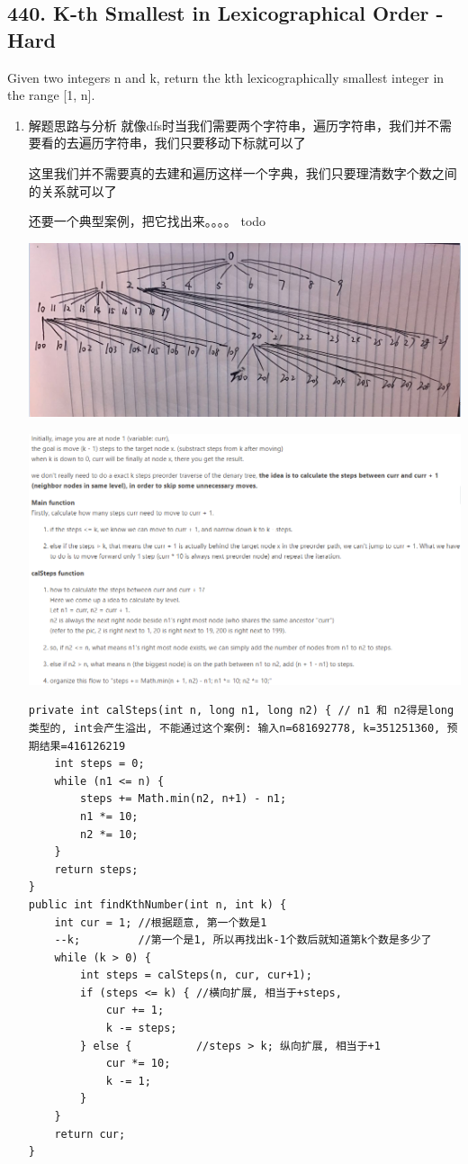 \documentclass[9pt, b5paaper]{book}
\begin{document}
\subsection{440. K-th Smallest in Lexicographical Order -  Hard}
\label{sec-2-1-4}
Given two integers n and k, return the kth lexicographically smallest integer in the range [1, n].
\begin{enumerate}
\item 解题思路与分析
\label{sec-2-1-4-1}
就像dfs时当我们需要两个字符串，遍历字符串，我们并不需要看的去遍历字符串，我们只要移动下标就可以了

这里我们并不需要真的去建和遍历这样一个字典，我们只要理清数字个数之间的关系就可以了

还要一个典型案例，把它找出来。。。。 todo

\includegraphics[width=.9\linewidth]{./pic/trie.png}

\includegraphics[width=.9\linewidth]{./pic/trie2.png}

\begin{verbatim}
private int calSteps(int n, long n1, long n2) { // n1 和 n2得是long类型的, int会产生溢出, 不能通过这个案例: 输入n=681692778, k=351251360, 预期结果=416126219
    int steps = 0;
    while (n1 <= n) {
        steps += Math.min(n2, n+1) - n1;
        n1 *= 10;
        n2 *= 10;
    }
    return steps;
}
public int findKthNumber(int n, int k) {
    int cur = 1; //根据题意, 第一个数是1
    --k;         //第一个是1, 所以再找出k-1个数后就知道第k个数是多少了
    while (k > 0) {
        int steps = calSteps(n, cur, cur+1);
        if (steps <= k) { //横向扩展, 相当于+steps,
            cur += 1;
            k -= steps;
        } else {          //steps > k; 纵向扩展, 相当于+1
            cur *= 10;
            k -= 1;
        }
    }
    return cur;
}
\end{verbatim}
\end{enumerate}
\end{document}
